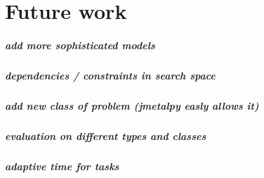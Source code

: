 \chapter{Future work}
\paragraph{add more sophisticated models}
\paragraph{dependencies / constraints in search space}
\paragraph{add new class of problem (jmetalpy easly allows it)}
\paragraph{evaluation on different types and classes}
\paragraph{adaptive time for tasks}

